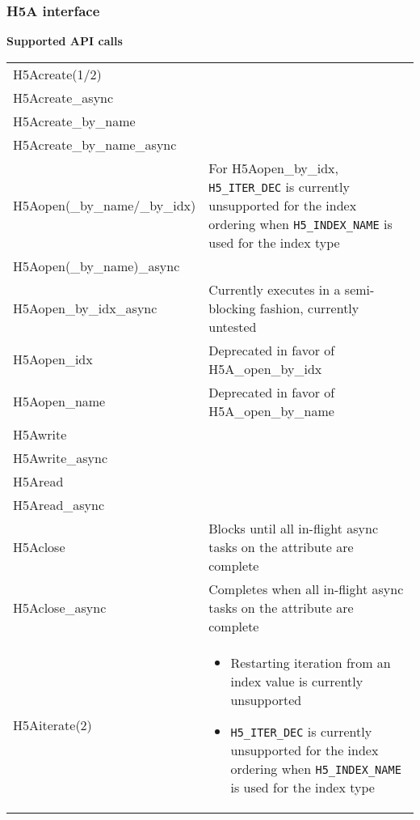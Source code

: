 \documentclass[../users_guide.tex]{subfiles}
\begin{document}
\newpage

\subsubsection{H5A interface}

\begin{center}

\textbf{Supported API calls}
\vspace{.2in} \\

\begin{tabularx}{\linewidth}{| X | >{\RaggedRight}X |}
\hline
\rowcolor{lightgray!50}%
\multicolumn{1}{| c |}{\textbf{API call}} & \multicolumn{1}{c |}{\textbf{Notes}} \\ \hline

H5Acreate(1/2) & \\ \hline
H5Acreate\_async & \\ \hline
H5Acreate\_by\_name & \\ \hline
H5Acreate\_by\_name\_async & \\ \hline
H5Aopen(\_by\_name/\_by\_idx) & For H5Aopen\_by\_idx, \texttt{H5\_ITER\_DEC} is currently unsupported for the index ordering when \texttt{H5\_INDEX\_NAME} is used for the index type\\ \hline
H5Aopen(\_by\_name)\_async & \\ \hline
H5Aopen\_by\_idx\_async & Currently executes in a semi-blocking fashion, currently untested\\ \hline
H5Aopen\_idx & Deprecated in favor of H5A\_open\_by\_idx\\ \hline
H5Aopen\_name & Deprecated in favor of H5A\_open\_by\_name\\ \hline
H5Awrite & \\ \hline
H5Awrite\_async & \\ \hline
H5Aread & \\ \hline
H5Aread\_async & \\ \hline
H5Aclose & Blocks until all in-flight async tasks on the attribute are complete\\ \hline
H5Aclose\_async & Completes when all in-flight async tasks on the attribute are complete\\ \hline
H5Aiterate(2) & \begin{itemize}
                    \item Restarting iteration from an index value is currently unsupported\footnotemark[1]
                    \item \texttt{H5\_ITER\_DEC} is currently unsupported for the index ordering when \texttt{H5\_INDEX\_NAME} is used for the index type
                \end{itemize}\\ \hline


\end{tabularx}
\end{center}
\end{document}
